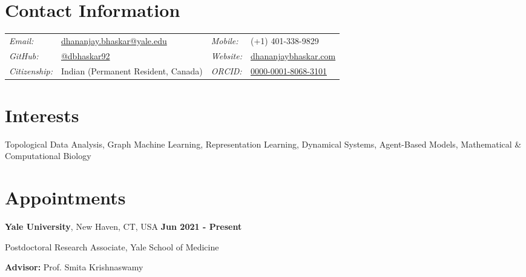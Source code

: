 \documentclass[margin,line]{res}
\newenvironment{list1}{
  \begin{list}{\ding{113}}{
      \setlength{\itemsep}{0in}
      \setlength{\parsep}{0in} \setlength{\parskip}{0in}
      \setlength{\topsep}{0in} \setlength{\partopsep}{0in}
      \setlength{\leftmargin}{0.17in}}}{\end{list}}
\begin{document}
\pagestyle{plain}


\begin{resume}

\vspace*{.2cm}

\section{\sc Contact Information}

\renewcommand{\arraystretch}{1.1}
\begin{tabular}{@{}p{1.8cm}p{6.3cm}p{2.1cm}p{4cm}}
{\it Email:} & \href{mailto:dhananjay.bhaskar@yale.edu}{dhananjay.bhaskar@yale.edu} & {\it Mobile:} & (+1) 401-338-9829  \\
{\it GitHub:} & \href{https://github.com/dbhaskar92}{@dbhaskar92} & {\it Website:} & \href{http://dhananjaybhaskar.com}{dhananjaybhaskar.com} \\
{\it Citizenship:} & Indian (Permanent Resident, Canada) & {\it ORCID:} & \href{https://orcid.org/0000-0001-8068-3101}{0000-0001-8068-3101} \\
\end{tabular}

\vspace*{.05cm}

\section{\sc Interests} Topological Data Analysis, Graph Machine Learning, Representation Learning, Dynamical Systems, 
Agent-Based Models, Mathematical \& Computational Biology

\vspace*{.05cm}

\section{\sc Appointments}

{\bf Yale University}, New Haven, CT, USA  \hfill {\bf Jun 2021 - Present}\\
\vspace*{-.2cm}
\begin{list1}
\item[] Postdoctoral Research Associate, Yale School of Medicine
\vspace*{.1cm}
\item[] {\bf Advisor:} Prof. Smita Krishnaswamy
\end{list1}


\end{resume}
\end{document}
